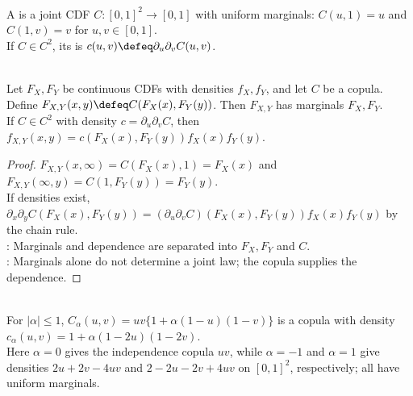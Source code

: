 \begin{definition} \label{def:copulas-and-copula-densities} \\
A  is a joint CDF $C:[0,1]^2\to[0,1]$ with uniform marginals: $C(u,1)=u$ and $C(1,v)=v$ for $u,v\in[0,1]$.\\
If $C\in C^2$, its  is $c(u,v)\defeq\partial_u\partial_vC(u,v)$.
\end{definition}

\begin{proposition} \label{prop:copula-density-construction} \\
Let $F_X,F_Y$ be continuous CDFs with densities $f_X,f_Y$, and let $C$ be a copula.\\
Define $F_{X,Y}(x,y)\defeq C(F_X(x),F_Y(y))$. Then $F_{X,Y}$ has marginals $F_X,F_Y$.\\
If $C\in C^2$ with density $c=\partial_u\partial_vC$, then $f_{X,Y}(x,y)=c(F_X(x),F_Y(y))f_X(x)f_Y(y)$.
\begin{proof} $F_{X,Y}(x,\infty)=C(F_X(x),1)=F_X(x)$ and $F_{X,Y}(\infty,y)=C(1,F_Y(y))=F_Y(y)$.\\
If densities exist, $\partial_x\partial_y C(F_X(x),F_Y(y))=(\partial_u\partial_vC)(F_X(x),F_Y(y))f_X(x)f_Y(y)$ by the chain rule.\\
: Marginals and dependence are separated into $F_X,F_Y$ and $C$.\\
: Marginals alone do not determine a joint law; the copula supplies the dependence.
\end{proof}
\end{proposition}

\begin{example} \label{ex:farlie-morgenstern-copulas} \\
For $|\alpha|\leq1$, $C_\alpha(u,v)=uv\{1+\alpha(1-u)(1-v)\}$ is a copula with density $c_\alpha(u,v)=1+\alpha(1-2u)(1-2v)$.\\
Here $\alpha=0$ gives the independence copula $uv$, while $\alpha=-1$ and $\alpha=1$ give densities $2u+2v-4uv$ and $2-2u-2v+4uv$ on $[0,1]^2$, respectively; all have uniform marginals.
\end{example}

